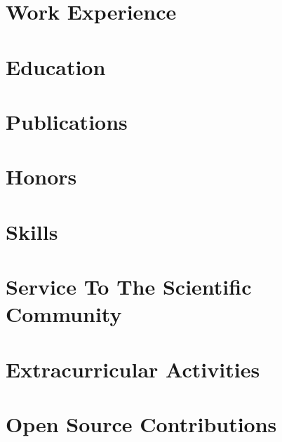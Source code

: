 \documentclass{prometheus_cv}
\begin{document}
\thispagestyle{empty}					%
\pagestyle{fancy}			 		%

\vspace*{-1cm}
{}

\vspace*{0.4cm}
\section{Work Experience}


\vspace*{0.4cm}
\section{Education}


\section{Publications}


\section{Honors}


\section{Skills}



\section{Service To The Scientific Community}



\section{Extracurricular Activities}


\section{Open Source Contributions}

\end{document}
